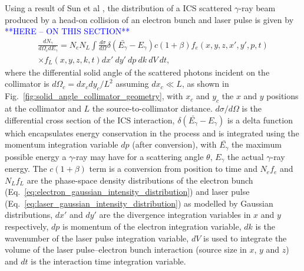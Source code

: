\documentclass[../main.tex]{subfiles}
\begin{document}
Using a result of Sun et al \cite{sun2009characterizations,sun2011theoretical}, the distribution of a ICS scattered $\gamma$-ray beam produced by a head-on collision of an electron bunch and laser pulse is given by \textcolor{blue}{**HERE -- ON THIS SECTION**}
\begin{multline}
\frac{dN_{\gamma}}{d\Omega_{c} dE_{\gamma}} = N_{e}N_{L}\int \frac{d\sigma}{d\Omega}\delta\left(\bar{E_{\gamma}}-E_{\gamma}\right)c\left(1+\beta\right)f_{e}\left(x,y,z,x',y',p,t\right)\\ \times f_L\left(x,y,z,k,t\right)dx'~dy'~dp~dk~dV~dt,
\label{eq:central_distribution_sun}
\end{multline}
where the differential solid angle of the scattered photons incident on the collimator is $d\Omega_{c} = dx_{c}dy_{c}/L^{2}$ assuming $dx_{c} \ll L$, as shown in Fig.~\ref{fig:solid_angle_collimator_geometry}, with $x_{c}$ and $y_{c}$ the $x$ and $y$ positions at the collimator and $L$ the source-to-collimator distance. $d\sigma/d\Omega$ is the differential cross section of the ICS interaction, $\delta\left(\bar{E_{\gamma}}-E_{\gamma}\right)$ is a delta function which encapsulates energy conservation in the process and is integrated using the momentum integration variable $dp$ (after conversion), with $\bar{E_{\gamma}}$ the maximum possible energy a $\gamma$-ray may have for a scattering angle $\theta$,  $E_{\gamma}$ the actual $\gamma$-ray energy. The $c\left(1+\beta\right)$ term is a conversion from position to time and $N_{e}f_{e}$ and $N_{L}f_{L}$ are the phase-space density distributions of the electron bunch (Eq.~\ref{eq:electron_gaussian_intensity_distribution}) and laser pulse (Eq.~\ref{eq:laser_gaussian_intensity_distribution}) as modelled by Gaussian distributions, $dx'$ and $dy'$ are the divergence integration variables in $x$ and $y$ respectively, $dp$ is momentum of the electron integration variable, $dk$ is the wavenumber of the laser pulse integration variable, $dV$ is used to integrate the volume of the laser pulse--electron bunch interaction (source size in $x$, $y$ and $z$) and  $dt$ is the interaction time integration variable. 
\end{document}
